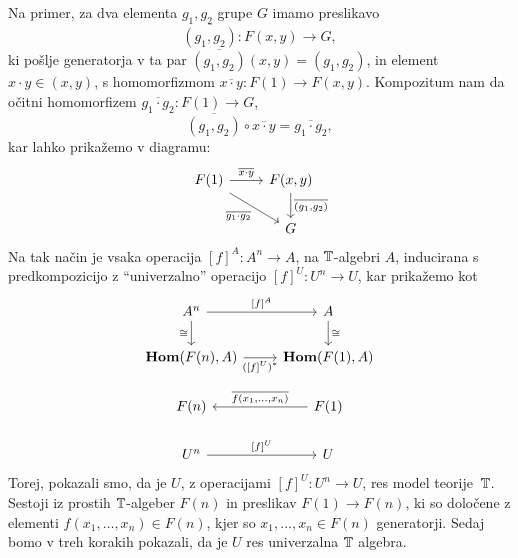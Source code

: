 \documentclass[../kategoricna_logika.tex]{subfiles}
\begin{document}
\begin{dokaz}
  Na primer, za dva elementa $g_1, g_2$ grupe $G$ imamo preslikavo
  \[\overline{(g_1, g_2)} : F(x,y) \to G, \]
  ki pošlje generatorja v ta par
  $\overline{(g_1, g_2)}(x,y) = (g_1, g_2)$, in element ${x \cdot y \in (x,y)}$,
  s homomorfizmom
  $\overline{x \cdot y}: F(1) \to F(x,y)$. Kompozitum nam da očitni homomorfizem
  $\overline{g_1 \cdot g_2} : F(1) \to G$,
  \[ \overline{(g_1, g_2)} \circ \overline{x \cdot y} = \overline{g_1 \cdot g_2}, \]
  kar lahko prikažemo v diagramu:
  \begin{equation*}
    \begin{tikzcd}
      F(1) \ar[dr, "{\overline{g_1 \cdot g_2}}"'] \ar[r, "{\overline{x \cdot y}}"] &
      F(x,y) \ar[d, "\overline{(g_1,g_2)}"] \\
      & G      
    \end{tikzcd}
  \end{equation*}
  Na tak način je vsaka operacija $[f]^A : A^n \to A$, na $\mathbb{T}$-algebri $A$, inducirana s
  predkompozicijo z "`univerzalno"' operacijo $[f]^U : U^n \to U$, kar prikažemo kot
  \begin{equation}\label{diag:univerzalna-operacija}
    \begin{tikzcd}
      A^n \ar[d, "\cong"'] \ar[r, "{[f]^{A}}"] & A \ar[d, "\cong"] \\
      \Hom(F(n), A) \ar[r, "{([f]^U)^{*}}"'] & \Hom(F(1), A) \\
      F(n) & F(1) \ar[l, "{\overline{f(x_1, \ldots, x_n)}}"'] \\
      U^n \ar[r, "{[f]^U}"] & U
    \end{tikzcd}
  \end{equation}
  Torej, pokazali smo, da je $U$, z operacijami $[f]^U : U^n \to U$, res
  model teorije~$\mathbb{T}$. Sestoji iz prostih $\mathbb{T}$-algeber $F(n)$ in
  preslikav $F(1) \to F(n)$, ki so določene z elementi $f(x_1, \ldots, x_n) \in F(n)$,
  kjer so $x_1, \ldots , x_n \in F(n)$ generatorji. Sedaj bomo v treh korakih pokazali,
  da je $U$ res univerzalna $\mathbb{T}$ algebra.


\end{dokaz}
\end{document}

